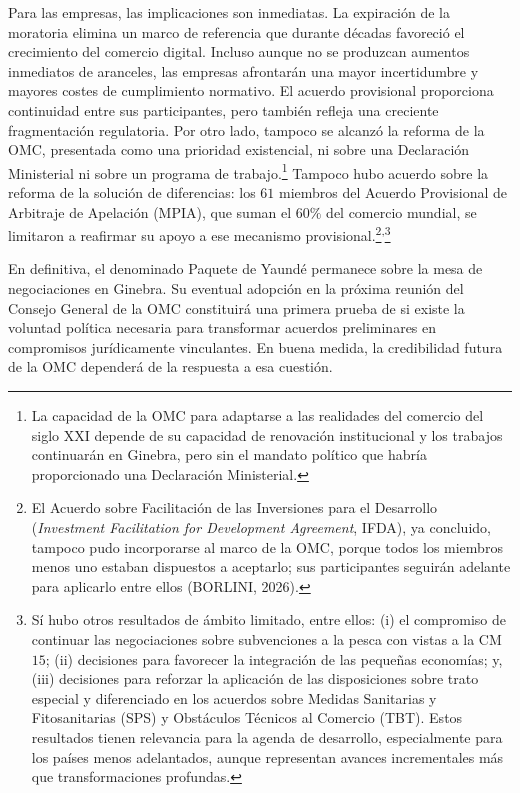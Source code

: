 \documentclass[10pt,a4paper]{article}
\begin{document}
{    Para las empresas, las implicaciones son inmediatas. La expiración de la moratoria elimina un marco de referencia que durante décadas favoreció el crecimiento del comercio digital. Incluso aunque no se produzcan aumentos inmediatos de aranceles, las empresas afrontarán una mayor incertidumbre y mayores costes de cumplimiento normativo. El acuerdo provisional proporciona continuidad entre sus participantes, pero también refleja una creciente fragmentación regulatoria.
} Por otro lado, tampoco se alcanzó la reforma de la OMC, presentada como una prioridad existencial, ni sobre una Declaración Ministerial ni sobre un programa de trabajo.\footnote{%
  La capacidad de la OMC para adaptarse a las realidades del comercio del siglo XXI depende de su capacidad de renovación institucional y los trabajos continuarán en Ginebra, pero sin el mandato político que habría proporcionado una Declaración Ministerial. 
} Tampoco hubo acuerdo sobre la reforma de la solución de diferencias: los $61$ miembros del Acuerdo Provisional de Arbitraje de Apelación (MPIA), que suman el $60\%$ del comercio mundial, se limitaron a reafirmar su apoyo a ese mecanismo provisional.\footnote{%
  El Acuerdo sobre Facilitación de las Inversiones para el Desarrollo (\textit{Investment Facilitation for Development Agreement}, IFDA), ya concluido, tampoco pudo incorporarse al marco de la OMC, porque todos los miembros menos uno estaban dispuestos a aceptarlo; sus participantes seguirán adelante para aplicarlo entre ellos (BORLINI, 2026).
}\textsuperscript{,}\footnote{%
  Sí hubo otros resultados de ámbito limitado, entre ellos: (i) el compromiso de continuar las negociaciones sobre subvenciones a la pesca con vistas a la CM$15$; (ii) decisiones para favorecer la integración de las pequeñas economías; y, (iii) decisiones para reforzar la aplicación de las disposiciones sobre trato especial y diferenciado en los acuerdos sobre Medidas Sanitarias y Fitosanitarias (SPS) y Obstáculos Técnicos al Comercio (TBT). Estos resultados tienen relevancia para la agenda de desarrollo, especialmente para los países menos adelantados, aunque representan avances incrementales más que transformaciones profundas.
}

En definitiva, el denominado Paquete de Yaundé permanece sobre la mesa de negociaciones en Ginebra. Su eventual adopción en la próxima reunión del Consejo General de la OMC constituirá una primera prueba de si existe la voluntad política necesaria para transformar acuerdos preliminares en compromisos jurídicamente vinculantes. En buena medida, la credibilidad futura de la OMC dependerá de la respuesta a esa cuestión.
\end{document}

